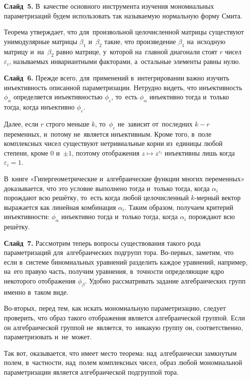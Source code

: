 \documentclass{article}
\begin{document}
  \textbf{Слайд~5.} В~качестве основного инструмента изучения мономиальных параметризаций будем использовать
  так называемую нормальную форму Смита.

  Теорема утверждает, что для~произвольной целочисленной матрицы существуют унимодулярные
  матрицы $\beta_1$ и~$\beta_2$ такие, что произведение $\beta_1$ на~исходную матрицу и~на~$\beta_2$ равно
  матрице, у~которой на~главной диагонали стоят $r$ чисел $\varepsilon_i$, называемых инвариантными факторами,
  а~остальные элементы равны нулю.

  \textbf{Слайд~6.} Прежде всего, для~применений в~интегрировании важно изучить инъективность описанной параметризации.
  Нетрудно видеть, что инъективность $\phi_\alpha$ определяется инъективностью $\phi_\varepsilon$,
  то~есть $\phi_\alpha$ инъективно тогда и~только тогда, когда инъективно $\phi_\varepsilon$.

  Далее, если $r$ строго меньше $k$, то~$\phi_\varepsilon$ не~зависит от~последних $k - r$ переменных, и~потому
  не~является инъективным. Кроме того, в~поле комплексных чисел существуют нетривиальные корни из~единицы любой
  степени, кроме $0$ и~$\pm 1$, поэтому отображения $z \mapsto z^{\varepsilon_i}$ инъективны лишь когда $\varepsilon_i = 1$.

  В~книге «Гипергеометрические и~алгебраические функции многих переменных» доказывается, что это условие выполнено тогда
  и~только тогда, когда $\alpha_i$ порождают всю решётку, то~есть когда любой целочисленный $k$-мерный вектор выражается
  как линейная комбинация $\alpha_i$.
  Таким образом, получаем критерий инъективности: $\phi_\alpha$ инъективно тогда и~только тогда, когда $\alpha_i$ порождают всю решётку.

  \textbf{Слайд~7.} Рассмотрим теперь вопросы существования такого рода параметризаций для~алгебраических подгрупп тора.
  Во-первых, заметим, что если в~системе биномиальных уравнений разделить каждое уравнений, например, на~его правую часть,
  получим уравнения, в~точности определяющие ядро некоторого отображения $\phi_\beta$. Удобно рассматривать задание алгебраических
  групп именно в~таком виде.

  Во-вторых, перед тем, как искать мономиальную параметризацию, следует проверить, что образ такого отображения является алгебраической
  группой. Если он алгебраической группой не~является, то~никакую группу он, соответственно, параметризовать и~не~может.

  Так вот, оказывается, что имеет место теорема: над~алгебраически замкнутым полем, в~частности, над~полем комплексных чисел, образ любой
  мономиальной параметризации является алгебраической подгруппой тора.
\end{document}
